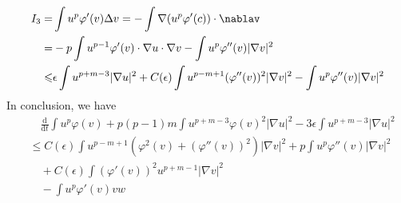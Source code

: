 \documentclass[12pt,]{article}
\begin{document}
\begin{equation}
  \begin{aligned}
    I_3=&\int u^p\varphi'(v)\Delta v = -\int \nabla(u^p\varphi'(c))\cdot\nablav\\
    =&-p\int u^{p-1}\varphi'(v)\cdot \nabla u\cdot\nabla v - \int u^p\varphi''(v)|\nabla v|^2\\
    \leqslant & \epsilon\int u^{p+m-3}|\nabla u |^{2}+C(\epsilon)\int u^{p-m+1}(\varphi''(v))^2|\nabla v|^2- \int u^p\varphi''(v)|\nabla v|^2
  \end{aligned}
\end{equation}
In conclusion, we have
\begin{equation}
  \begin{aligned}
    &\quad\frac{\mathrm{d}}{\mathrm{d} t} \int u^{p} \varphi(v) + p(p-1)m\int u^{p+m-3}\varphi(v)^2|\nabla u| ^2 - 3\epsilon\int u^{p+m-3}|\nabla u| ^2\\
    &\leqslant C(\epsilon)\int u^{p-m+1}\left(\varphi^2(v)+(\varphi''(v))^2\right)|\nabla v|^2 + p\int u^p\varphi''(v)|\nabla v|^2\\
    &\quad +C(\epsilon)\int (\varphi'(v))^2u^{p+m-1}|\nabla v|^2\\
    &\quad - \int u^p\varphi'(v)vw
  \end{aligned}
\end{equation}



% 
\end{document}
